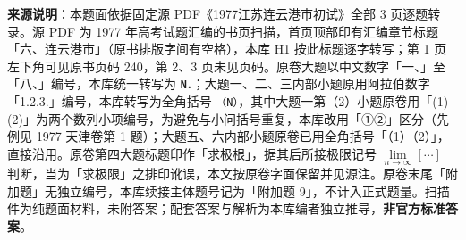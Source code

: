 


\begin{gktip}
\textbf{来源说明}：本题面依据固定源 PDF《1977江苏连云港市初试》全部 3 页逐题转录。源 PDF 为 1977 年高考试题汇编的书页扫描，首页顶部印有汇编章节标题「六、连云港市」（原书排版字间有空格），本库 H1 按此标题逐字转写；第 1 页左下角可见原书页码 240，第 2、3 页未见页码。原卷大题以中文数字「一、」至「八、」编号，本库统一转写为 \texttt{\textbf{N．}}；大题一、二、三内部小题原用阿拉伯数字「1.2.3.」编号，本库转写为全角括号 \texttt{（N）}，其中大题一第（2）小题原卷用「(1)(2)」为两个数列小项编号，为避免与小问括号重复，本库改用「①②」区分（先例见 1977 天津卷第 1 题）；大题五、六内部小题原卷已用全角括号「（1）（2）」，直接沿用。原卷第四大题标题印作「求极根」，据其后所接极限记号 $\lim\limits_{n\to\infty}[\cdots]$ 判断，当为「求极限」之排印讹误，本文按原卷字面保留并见源注。原卷末尾「附加题」无独立编号，本库续接主体题号记为「附加题 9」，不计入正式题量。扫描件为纯题面材料，未附答案；配套答案与解析为本库编者独立推导，\textbf{非官方标准答案}。
\end{gktip}

\par\medskip

